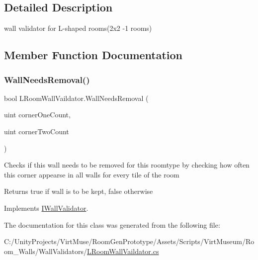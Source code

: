 \subsection{Detailed Description}
wall validator for L-\/shaped rooms(2x2 -\/1 rooms) 



\subsection{Member Function Documentation}
\mbox{\label{class_l_room_wall_vaildator_a1de3495c1d8cc0a4591b617d2137b497}} 
\subsubsection{\texorpdfstring{Wall\+Needs\+Removal()}{WallNeedsRemoval()}}
{\footnotesize\ttfamily bool L\+Room\+Wall\+Vaildator.\+Wall\+Needs\+Removal (\begin{DoxyParamCaption}\item[{uint}]{corner\+One\+Count,  }\item[{uint}]{corner\+Two\+Count }\end{DoxyParamCaption})}



Checks if this wall needs to be removed for this roomtype by checking how often this corner appearse in all walls for every tile of the room 

\begin{DoxyReturn}{Returns}
true if wall is to be kept, false otherwise
\end{DoxyReturn}


Implements \mbox{\hyperlink{interface_i_wall_validator_a1618acf45bf2614985aeb8b240bf7da8}{I\+Wall\+Validator}}.



The documentation for this class was generated from the following file\+:\begin{DoxyCompactItemize}
\item 
C\+:/\+Unity\+Projects/\+Virt\+Muse/\+Room\+Gen\+Prototype/\+Assets/\+Scripts/\+Virt\+Museum/\+Room\+\_\+\+Walls/\+Wall\+Validators/\mbox{\hyperlink{_l_room_wall_vaildator_8cs}{L\+Room\+Wall\+Vaildator.\+cs}}\end{DoxyCompactItemize}
